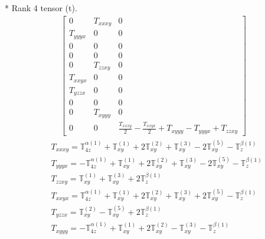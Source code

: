 \documentclass[fleqn,8pt,landscape]{jsarticle}
\begin{document}
* Rank 4 tensor (t).
\begin{align*}
\begin{bmatrix} 0 & T_{xxxy} & 0 \\ T_{yyyx} & 0 & 0 \\ 0 & 0 & 0 \\ 0 & 0 & 0 \\ 0 & T_{zzxy} & 0 \\ T_{xxyx} & 0 & 0 \\ T_{yzzx} & 0 & 0 \\ 0 & 0 & 0 \\ 0 & T_{xyyy} & 0 \\ 0 & 0 & \frac{T_{xxxy}}{2} - \frac{T_{xxyx}}{2} + T_{xyyy} - T_{yyyx} + T_{zzxy} \end{bmatrix}
\end{align*}
\begin{align*}
& T_{xxxy} = \mathbb{T}_{4z}^{\alpha(1)} + \mathbb{T}_{xy}^{(1)} + 2 \mathbb{T}_{xy}^{(2)} + \mathbb{T}_{xy}^{(3)} - 2 \mathbb{T}_{xy}^{(5)} - \mathbb{T}_{z}^{\beta(1)} \\
& T_{yyyx} = - \mathbb{T}_{4z}^{\alpha(1)} + \mathbb{T}_{xy}^{(1)} + 2 \mathbb{T}_{xy}^{(2)} + \mathbb{T}_{xy}^{(3)} - 2 \mathbb{T}_{xy}^{(5)} - \mathbb{T}_{z}^{\beta(1)} \\
& T_{zzxy} = \mathbb{T}_{xy}^{(1)} + \mathbb{T}_{xy}^{(3)} + 2 \mathbb{T}_{z}^{\beta(1)} \\
& T_{xxyx} = \mathbb{T}_{4z}^{\alpha(1)} + \mathbb{T}_{xy}^{(1)} + 2 \mathbb{T}_{xy}^{(2)} + \mathbb{T}_{xy}^{(3)} + 2 \mathbb{T}_{xy}^{(5)} - \mathbb{T}_{z}^{\beta(1)} \\
& T_{yzzx} = \mathbb{T}_{xy}^{(2)} - \mathbb{T}_{xy}^{(5)} + 2 \mathbb{T}_{z}^{\beta(1)} \\
& T_{xyyy} = - \mathbb{T}_{4z}^{\alpha(1)} + \mathbb{T}_{xy}^{(1)} + 2 \mathbb{T}_{xy}^{(2)} - \mathbb{T}_{xy}^{(3)} - \mathbb{T}_{z}^{\beta(1)}
\end{align*}
\end{document}
